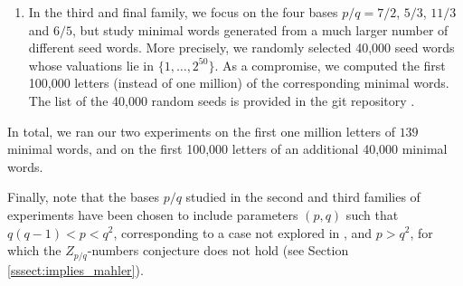\documentclass{template_arxiv}
\numberwithin{equation}{section}
\begin{document}
\begin{enumerate}
\vspace{-0.5cm}
\[
    \left\{\begin{array}{c} \text{valuations of chosen} \\ \text{seed words for base $8/5$}\end{array}\right\} \;=\; \left\{\begin{array}{c} 61, 111, 116, 414, 432, 455, 477, 551, 592, 664 \\ 711, 749, 772, 791, 835, 856, 878, 945, 961, 965 \end{array}\right\}
\]



\vspace{-0.5cm}
\[
\left\{\begin{array}{c} \text{valuations of chosen} \\ \text{seed words for base $26/5$}\end{array}\right\} \;=\; \left\{\begin{array}{c}52, 121, 134, 186, 239, 248, 294, 390, 453, 505, \\ 519, 600, 670, 671, 795, 816, 878, 916, 917, 962\end{array}\right\}
\]



\normalsize
Again, we computed the first one million letters of these 120 minimal words.



\item In the third and final family, we focus on the four bases $p/q = 7/2$, $5/3$, $11/3$ and $6/5$, but study minimal words generated from a much larger number of different seed words. More precisely, we randomly selected 40,000 seed words whose valuations lie in $\{1,\dots,2^{50}\}$.  As a compromise, we computed the first 100,000 letters (instead of one million) of the corresponding minimal words. The list of the 40,000 random seeds is provided in the git repository \cite{Git26}.
\end{enumerate}
In total, we ran our two experiments on the first one million letters of $139$ minimal words, and on the first 100,000 letters of an additional 40,000 minimal words. 


Finally, note that the bases $p/q$ studied in the second and third families of experiments have been chosen to include parameters $(p,q)$ such that $q(q-1)<p<q^2$, corresponding to a case not explored in \cite{DM09}, and   $p>q^2$, for which the $Z_{p/q}$-numbers conjecture does not hold (see Section \ref{sssect:implies_mahler}).
\end{document}
